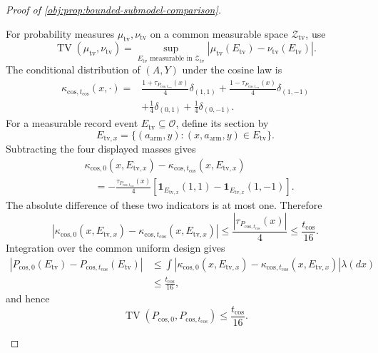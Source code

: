 \begin{proof}[Proof of \cref{obj:prop:bounded-submodel-comparison}]
\begin{enumerate}
For probability measures \(\mu_{\mathrm{tv}},\nu_{\mathrm{tv}}\) on a common measurable space \(\mathcal Z_{\mathrm{tv}}\), use
\[
\operatorname{TV}(\mu_{\mathrm{tv}},\nu_{\mathrm{tv}})
=
\sup_{E_{\mathrm{tv}}\text{ measurable in }\mathcal Z_{\mathrm{tv}}}
|\mu_{\mathrm{tv}}(E_{\mathrm{tv}})
 -\nu_{\mathrm{tv}}(E_{\mathrm{tv}})|.
\]
The conditional distribution of \((A,Y)\) under the cosine law is
\[
\begin{split}
\kappa_{\mathrm{cos},t_{\mathrm{cos}}}(x,\cdot)
={}&\frac{1+\tau_{P_{\mathrm{cos},t_{\mathrm{cos}}}}(x)}4
       \delta_{(1,1)}
+\frac{1-\tau_{P_{\mathrm{cos},t_{\mathrm{cos}}}}(x)}4
       \delta_{(1,-1)}\\
&+\frac14\delta_{(0,1)}+\frac14\delta_{(0,-1)}.
\end{split}
\]
For a measurable record event \(E_{\mathrm{tv}}\subseteq\mathcal O\), define its section by
\[
E_{\mathrm{tv},x}
=\{(a_{\mathrm{arm}},y):
  (x,a_{\mathrm{arm}},y)\in E_{\mathrm{tv}}\}.
\]
Subtracting the four displayed masses gives
\[
\begin{split}
&\kappa_{\mathrm{cos},0}(x,E_{\mathrm{tv},x})
-\kappa_{\mathrm{cos},t_{\mathrm{cos}}}(x,E_{\mathrm{tv},x})\\
&\quad=
-\frac{\tau_{P_{\mathrm{cos},t_{\mathrm{cos}}}}(x)}4
\left[
\mathbf1_{E_{\mathrm{tv},x}}(1,1)
-\mathbf1_{E_{\mathrm{tv},x}}(1,-1)
\right].
\end{split}
\]
The absolute difference of these two indicators is at most one. Therefore
\[
\left|
\kappa_{\mathrm{cos},0}(x,E_{\mathrm{tv},x})
-\kappa_{\mathrm{cos},t_{\mathrm{cos}}}(x,E_{\mathrm{tv},x})
\right|
\le
\frac{|\tau_{P_{\mathrm{cos},t_{\mathrm{cos}}}}(x)|}{4}
\le\frac{t_{\mathrm{cos}}}{16}.
\]
Integration over the common uniform design gives
\[
\begin{split}
|P_{\mathrm{cos},0}(E_{\mathrm{tv}})
-P_{\mathrm{cos},t_{\mathrm{cos}}}(E_{\mathrm{tv}})|
&\le
\int
\left|
\kappa_{\mathrm{cos},0}(x,E_{\mathrm{tv},x})
-\kappa_{\mathrm{cos},t_{\mathrm{cos}}}(x,E_{\mathrm{tv},x})
\right|\lambda(dx)\\
&\le\frac{t_{\mathrm{cos}}}{16},
\end{split}
\]
and hence
\[
\operatorname{TV}
(P_{\mathrm{cos},0},P_{\mathrm{cos},t_{\mathrm{cos}}})
\le\frac{t_{\mathrm{cos}}}{16}.
\]


\end{enumerate}
\end{proof}

